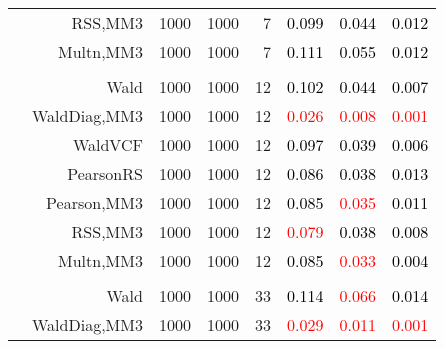 \documentclass[
]{article}
\begin{document}
\begin{table}[H]
{\begin{tabular}[t]{lrrrrrrr}
\hspace{1em} & RSS,MM3 & 1000 & 1000 & 7 & \textcolor{black}{0.099} & \textcolor{black}{0.044} & \textcolor{black}{0.012}\\

\hspace{1em} & Multn,MM3 & 1000 & 1000 & 7 & \textcolor{black}{0.111} & \textcolor{black}{0.055} & \textcolor{black}{0.012}\\
\cmidrule{1-8}
\addlinespace[0.3em]
\multicolumn{8}{l}{\textbf{2F 10V}}\\
\hspace{1em} & Wald & 1000 & 1000 & 12 & \textcolor{black}{0.102} & \textcolor{black}{0.044} & \textcolor{black}{0.007}\\

\hspace{1em} & WaldDiag,MM3 & 1000 & 1000 & 12 & \textcolor{red}{0.026} & \textcolor{red}{0.008} & \textcolor{red}{0.001}\\

\hspace{1em} & WaldVCF & 1000 & 1000 & 12 & \textcolor{black}{0.097} & \textcolor{black}{0.039} & \textcolor{black}{0.006}\\

\hspace{1em} & PearsonRS & 1000 & 1000 & 12 & \textcolor{black}{0.086} & \textcolor{black}{0.038} & \textcolor{black}{0.013}\\

\hspace{1em} & Pearson,MM3 & 1000 & 1000 & 12 & \textcolor{black}{0.085} & \textcolor{red}{0.035} & \textcolor{black}{0.011}\\

\hspace{1em} & RSS,MM3 & 1000 & 1000 & 12 & \textcolor{red}{0.079} & \textcolor{black}{0.038} & \textcolor{black}{0.008}\\

\hspace{1em} & Multn,MM3 & 1000 & 1000 & 12 & \textcolor{black}{0.085} & \textcolor{red}{0.033} & \textcolor{black}{0.004}\\
\cmidrule{1-8}
\addlinespace[0.3em]
\multicolumn{8}{l}{\textbf{3F 15V}}\\
\hspace{1em} & Wald & 1000 & 1000 & 33 & \textcolor{black}{0.114} & \textcolor{red}{0.066} & \textcolor{black}{0.014}\\

\hspace{1em} & WaldDiag,MM3 & 1000 & 1000 & 33 & \textcolor{red}{0.029} & \textcolor{red}{0.011} & \textcolor{red}{0.001}\\


\end{tabular}}
\end{table}
\end{document}
